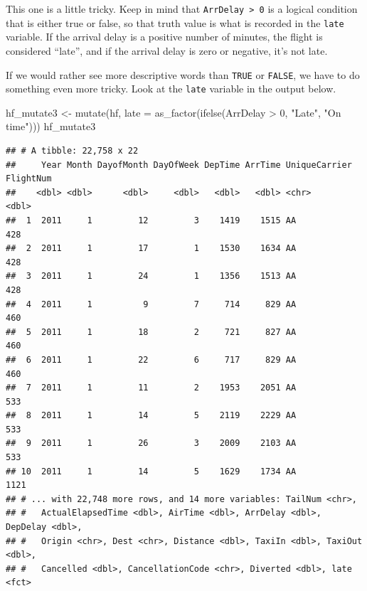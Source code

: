 \documentclass[
]{book}
\newenvironment{Shaded}{\begin{snugshade}}{\end{snugshade}}
\newcommand{\AttributeTok}[1]{\textcolor[rgb]{0.77,0.63,0.00}{#1}}
\newcommand{\DecValTok}[1]{\textcolor[rgb]{0.00,0.00,0.81}{#1}}
\newcommand{\FunctionTok}[1]{\textcolor[rgb]{0.00,0.00,0.00}{#1}}
\newcommand{\NormalTok}[1]{#1}
\newcommand{\OtherTok}[1]{\textcolor[rgb]{0.56,0.35,0.01}{#1}}
\newcommand{\SpecialCharTok}[1]{\textcolor[rgb]{0.00,0.00,0.00}{#1}}
\newcommand{\StringTok}[1]{\textcolor[rgb]{0.31,0.60,0.02}{#1}}
\begin{document}
This one is a little tricky. Keep in mind that \texttt{ArrDelay\ \textgreater{}\ 0} is a logical condition that is either true or false, so that truth value is what is recorded in the \texttt{late} variable. If the arrival delay is a positive number of minutes, the flight is considered ``late'', and if the arrival delay is zero or negative, it's not late.

If we would rather see more descriptive words than \texttt{TRUE} or \texttt{FALSE}, we have to do something even more tricky. Look at the \texttt{late} variable in the output below.

\begin{Shaded}
\begin{Highlighting}[]
\NormalTok{hf\_mutate3 }\OtherTok{\textless{}{-}} \FunctionTok{mutate}\NormalTok{(hf,}
                     \AttributeTok{late =} \FunctionTok{as\_factor}\NormalTok{(}\FunctionTok{ifelse}\NormalTok{(ArrDelay }\SpecialCharTok{\textgreater{}} \DecValTok{0}\NormalTok{, }
                                             \StringTok{"Late"}\NormalTok{, }\StringTok{"On time"}\NormalTok{)))}
\NormalTok{hf\_mutate3}
\end{Highlighting}
\end{Shaded}

\begin{verbatim}
## # A tibble: 22,758 x 22
##     Year Month DayofMonth DayOfWeek DepTime ArrTime UniqueCarrier FlightNum
##    <dbl> <dbl>      <dbl>     <dbl>   <dbl>   <dbl> <chr>             <dbl>
##  1  2011     1         12         3    1419    1515 AA                  428
##  2  2011     1         17         1    1530    1634 AA                  428
##  3  2011     1         24         1    1356    1513 AA                  428
##  4  2011     1          9         7     714     829 AA                  460
##  5  2011     1         18         2     721     827 AA                  460
##  6  2011     1         22         6     717     829 AA                  460
##  7  2011     1         11         2    1953    2051 AA                  533
##  8  2011     1         14         5    2119    2229 AA                  533
##  9  2011     1         26         3    2009    2103 AA                  533
## 10  2011     1         14         5    1629    1734 AA                 1121
## # ... with 22,748 more rows, and 14 more variables: TailNum <chr>,
## #   ActualElapsedTime <dbl>, AirTime <dbl>, ArrDelay <dbl>, DepDelay <dbl>,
## #   Origin <chr>, Dest <chr>, Distance <dbl>, TaxiIn <dbl>, TaxiOut <dbl>,
## #   Cancelled <dbl>, CancellationCode <chr>, Diverted <dbl>, late <fct>
\end{verbatim}
\end{document}
